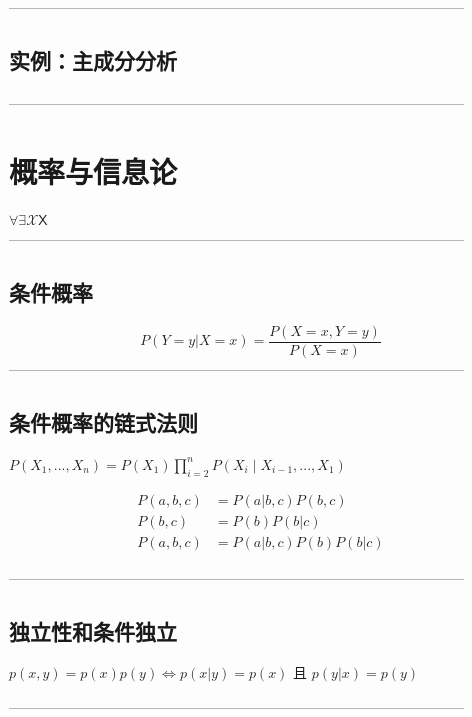 \documentclass{article}
\begin{document}
--------------------------------------------------------------------------------------------------

\subsection{实例：主成分分析}

--------------------------------------------------------------------------------------------------

\section{概率与信息论}
$\forall \exists \mathcal{X} \mathsf{X} $ \\

--------------------------------------------------------------------------------------------------
\subsection{条件概率}
\begin{equation}
    P(Y=y|X=x) = \frac{P(X=x,Y=y)}{P(X=x)}
    \end{equation}
--------------------------------------------------------------------------------------------------
\subsection{条件概率的链式法则}
$P(X_1, ..., X_n) = P(X_1) \prod_{i=2}^n P(X_i \mid X_{i-1},...,X_1)$

$$
\begin{aligned}
    P(a,b,c) &= P(a|b,c)P(b,c) \\
    P(b,c) &= P(b)P(b|c) \\
    P(a,b,c) &= P(a|b,c)P(b)P(b|c)
\end{aligned}
$$

--------------------------------------------------------------------------------------------------
\subsection{独立性和条件独立}
$p(x,y) = p(x)p(y) \Leftrightarrow p(x|y)=p(x) \text{ 且 } p(y|x)=p(y)$

--------------------------------------------------------------------------------------------------
\end{document}
